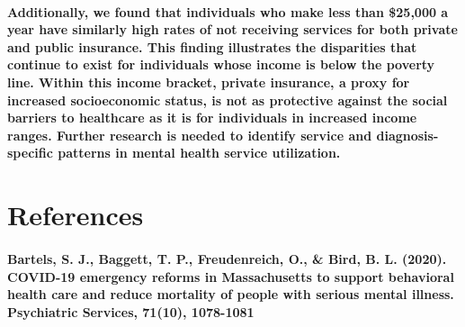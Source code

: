 \documentclass[
  12pt,
]{article}
\begin{document}
\hypertarget{additionally-we-found-that-individuals-who-make-less-than-25000-a-year-have-similarly-high-rates-of-not-receiving-services-for-both-private-and-public-insurance.-this-finding-illustrates-the-disparities-that-continue-to-exist-for-individuals-whose-income-is-below-the-poverty-line.-within-this-income-bracket-private-insurance-a-proxy-for-increased-socioeconomic-status-is-not-as-protective-against-the-social-barriers-to-healthcare-as-it-is-for-individuals-in-increased-income-ranges.-further-research-is-needed-to-identify-service-and-diagnosis-specific-patterns-in-mental-health-service-utilization.}{%
\paragraph{Additionally, we found that individuals who make less than
\$25,000 a year have similarly high rates of not receiving services for
both private and public insurance. This finding illustrates the
disparities that continue to exist for individuals whose income is below
the poverty line. Within this income bracket, private insurance, a proxy
for increased socioeconomic status, is not as protective against the
social barriers to healthcare as it is for individuals in increased
income ranges. Further research is needed to identify service and
diagnosis-specific patterns in mental health service
utilization.}\label{additionally-we-found-that-individuals-who-make-less-than-25000-a-year-have-similarly-high-rates-of-not-receiving-services-for-both-private-and-public-insurance.-this-finding-illustrates-the-disparities-that-continue-to-exist-for-individuals-whose-income-is-below-the-poverty-line.-within-this-income-bracket-private-insurance-a-proxy-for-increased-socioeconomic-status-is-not-as-protective-against-the-social-barriers-to-healthcare-as-it-is-for-individuals-in-increased-income-ranges.-further-research-is-needed-to-identify-service-and-diagnosis-specific-patterns-in-mental-health-service-utilization.}}

\newpage

\hypertarget{references}{%
\section{\texorpdfstring{\textbf{References}}{References}}\label{references}}

\hypertarget{bartels-s.-j.-baggett-t.-p.-freudenreich-o.-bird-b.-l.-2020.-covid-19-emergency-reforms-in-massachusetts-to-support-behavioral-health-care-and-reduce-mortality-of-people-with-serious-mental-illness.-psychiatric-services-7110-1078-1081}{%
\paragraph{Bartels, S. J., Baggett, T. P., Freudenreich, O., \& Bird, B.
L. (2020). COVID-19 emergency reforms in Massachusetts to support
behavioral health care and reduce mortality of people with serious
mental illness. Psychiatric Services, 71(10),
1078-1081}\label{bartels-s.-j.-baggett-t.-p.-freudenreich-o.-bird-b.-l.-2020.-covid-19-emergency-reforms-in-massachusetts-to-support-behavioral-health-care-and-reduce-mortality-of-people-with-serious-mental-illness.-psychiatric-services-7110-1078-1081}}
\end{document}
